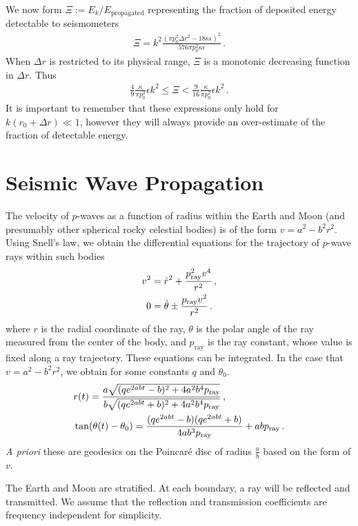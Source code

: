 \documentclass[prd,reprint,10pt,tightenlines]{revtex4-1}
\newcommand*\te[1]{\text{#1}}
\newcommand*\p[1]{\left(#1\right)}
\newcommand*\f[2]{\frac{#1}{#2}}
\begin{document}
We now form $\Xi:=E_k/E_\te{propagated}$ representing the fraction of deposited energy detectable to seismometers
\begin{align}
\Xi = k^2\f{\p{\pi p_0^2\Delta r^2-18\kappa \epsilon}^2}{576 \pi p_0^2 \kappa \epsilon}\,.
\end{align}
When $\Delta r$ is restricted to its physical range, $\Xi$ is a monotonic decreasing function in $\Delta r$. Thus
\begin{align}
\f{4}{9}\f{\kappa}{\pi p_0^2} \epsilon k^2\leq \Xi <\f{9}{16}\f{\kappa}{\pi p_0^2}\epsilon k^2\,.
\end{align}
It is important to remember that these expressions only hold for $k(r_0+\Delta r)\ll 1$, however they will always provide an over-estimate of the fraction of detectable energy.

\section{Seismic Wave Propagation}
The velocity of $p$-waves as a function of radius within the Earth and Moon (and presumably other spherical rocky celestial bodies) is of the form $v = a^2 - b^2 r^2$. Using Snell's law, we obtain the differential equations for the trajectory of $p$-wave rays within such bodies
\begin{align}
v^2 \notag&= \dot r^2 + \f{p_\te{ray}^2 v^4}{r^2}\,,\\
0 &=\dot\theta\pm\f{p_\te{ray} v^2}{r^2}\,.
\end{align}
where $r$ is the radial coordinate of the ray, $\theta$ is the polar angle of the ray measured from the center of the body, and $p_\te{ray}$ is the ray constant, whose value is fixed along a ray trajectory. These equations can be integrated. In the case that $v = a^2 - b^2 r^2$, we obtain for some constants $q$ and $\theta_0$.
\begin{align}
\notag&r(t) = \f{a\sqrt{(qe^{2abt}-b)^2 + 4a^2b^4 p_\te{ray}}}{b\sqrt{(qe^{2abt}+b)^2 + 4a^2b^4 p_\te{ray}}}\,,\\
&\tan(\theta(t) - \theta_0) = \f{(qe^{2abt}-b)(qe^{2abt}+b)}{4ab^3p_\te{ray}}+abp_\te{ray}\,.
\end{align}
\textit{A priori} these are geodesics on the Poincar\'e disc of radius $\f ab$ based on the form of $v$. 

The Earth and Moon are stratified. At each boundary, a ray will be reflected and transmitted. We assume that the reflection and transmission coefficients are frequency independent for simplicity. 
\end{document}
